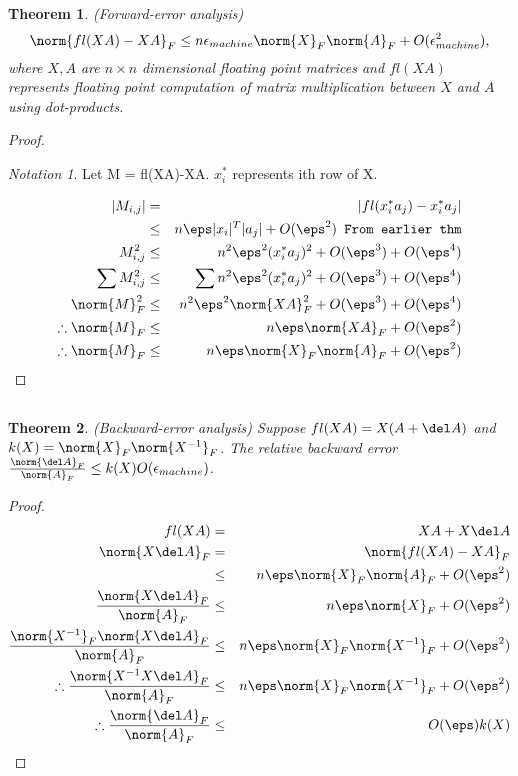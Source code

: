 \documentclass[10pt]{amsart}
\newtheorem{thm}{Theorem}[subsection]
\theoremstyle{remark}
\newtheorem*{notation}{Notation}
\begin{document}
\subsection{}
\begin{thm}
(Forward-error analysis)
$$\norm{fl(XA)-XA}_F\leq n\epsilon_{machine}\norm{X}_F\norm{A}_F+O(\epsilon_{machine}^2),$$
where $X, A$ are $n\times n$ dimensional floating  point matrices %
and $fl(XA)$ represents floating point computation of matrix multiplication between $X$ and $A$ using dot-products. 
\end{thm}
\begin{proof}
\begin{notation}
Let M = fl(XA)-XA. $x_{i}^{*}$ represents ith row of X.
\end{notation}

\begin{eqnarray*}
|M_{i,j}| &=& |fl(x_{i}^{*}a_{j})-x_{i}^{*}a_{j}|\\
&\leq& n\eps|x_{i}|^T|a_{j}|+O(\eps^2) \texttt{ From earlier thm}\\
M_{i,j}^{2} &\leq& n^{2}\eps^{2}(x_{i}^*a_{j})^{2}+O(\eps^3)+O(\eps^4)\\
\sum M_{i,j}^{2} &\leq& \sum n^{2}\eps^{2}(x_{i}^*a_{j})^{2}+O(\eps^3)+O(\eps^4)\\
\norm{M}_{F}^{2} &\leq& n^{2}\eps^{2}\norm{XA}_{F}^{2}+O(\eps^3)+O(\eps^4)\\
\therefore \norm{M}_{F} &\leq& n\eps\norm{XA}_{F}+O(\eps^2)\\
\therefore \norm{M}_{F} &\leq& n\eps\norm{X}_{F}\norm{A}_{F}+O(\eps^2)\\
\end{eqnarray*}
\end{proof}


\subsection{}
\begin{thm}
(Backward-error analysis)
Suppose $fl(XA) = X(A+\del A)$ and $k(X) = \norm{X}_{F}\norm{X^{-1}}_{F}$.
The relative backward error $\frac{\norm{\del A}_F}{\norm{A}_F}\leq k(X)O(\epsilon_{machine})$.
\end{thm}
\begin{proof}
\begin{eqnarray*}
fl(XA) &=& XA+X\del A\\
\norm{X\del A}_{F} &=& \norm{fl(XA) - XA}_{F}\\
&\leq& n\eps\norm{X}_{F}\norm{A}_{F}+O(\eps^2)\\
\frac{\norm{X\del A}_{F}}{\norm{A}_{F}}&\leq& n\eps\norm{X}_{F}+O(\eps^2)\\
\frac{\norm{X^{-1}}_{F}\norm{X\del A}_{F}}{\norm{A}_{F}}&\leq& n\eps\norm{X}_{F}\norm{X^{-1}}_{F}+O(\eps^2)\\
\therefore \frac{\norm{X^{-1}X\del A}_{F}}{\norm{A}_{F}}&\leq& n\eps\norm{X}_{F}\norm{X^{-1}}_{F}+O(\eps^2)\\
\therefore \frac{\norm{\del A}_{F}}{\norm{A}_{F}}&\leq& O(\eps)k(X)\\
\end{eqnarray*}
\end{proof}
\end{document}
